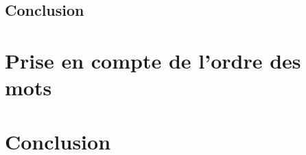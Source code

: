 \documentclass{article}
\begin{document}

\subsection{Conclusion}




\section{Prise en compte de l'ordre des mots}

\section{Conclusion}



\end{document}
